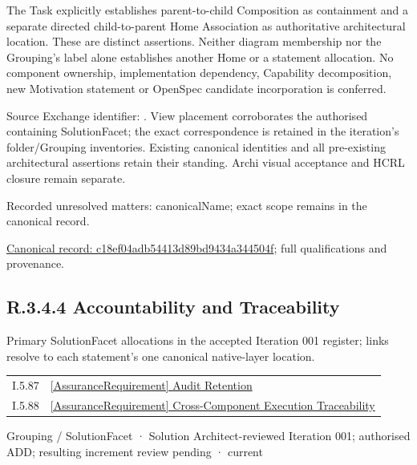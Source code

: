 The Task explicitly establishes parent-to-child Composition as containment and
a separate directed child-to-parent Home Association as authoritative architectural
location. These are distinct assertions. Neither diagram membership nor the
Grouping's label alone establishes another Home or a statement allocation.
No component ownership, implementation dependency, Capability decomposition,
new Motivation statement or OpenSpec candidate incorporation is conferred.



Source Exchange identifier: \texttt{}. View placement corroborates
the authorised containing SolutionFacet; the exact correspondence is retained in the
iteration's folder/Grouping inventories. Existing canonical identities and all
pre-existing architectural assertions retain their standing. Archi visual
acceptance and HCRL closure remain separate.


{\small Recorded unresolved matters: canonicalName; exact scope remains in the canonical record.}\par
{\footnotesize \href{../../../../../../../continuum/grouping/c18ef04adb54413d89bd9434a344504f.md}{Canonical record: c18ef04adb54413d89bd9434a344504f}; full qualifications and provenance.}\par
\subsection*{R.3.4.4 Accountability and Traceability}
\label{navigation:R.3.4.4}

Primary SolutionFacet allocations in the accepted Iteration 001 register; links resolve to each statement’s one canonical native-layer location.\par
\begin{longtable}{p{.22\linewidth}p{.73\linewidth}}
I.5.87 & \hyperref[element:44b1a897fd1a41c097a1138bfee9cea6]{[AssuranceRequirement] Audit Retention} \\
I.5.88 & \hyperref[element:8014fbaa48b5435785fced72aa748da6]{[AssuranceRequirement] Cross-Component Execution Traceability} \\
\end{longtable}
\label{element:38d3dfcd23894f43b59d00c782170e63}
{\small Grouping / SolutionFacet · Solution Architect-reviewed Iteration 001; authorised ADD; resulting increment review pending · current}\par

